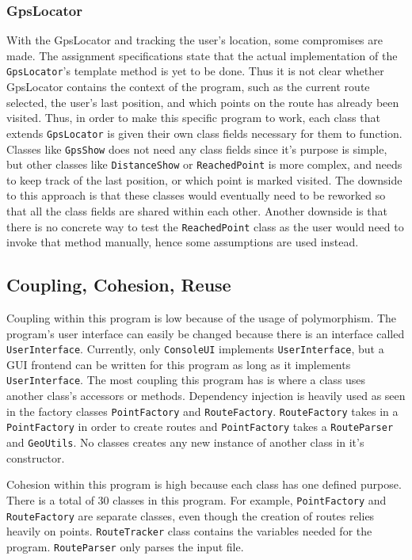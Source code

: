 \documentclass[a4paper, 12pt, titlepage]{article}
\newcommand{\code}[1]{\small\texttt{#1}\normalsize}
\begin{document}
\subsubsection{GpsLocator}

With the GpsLocator and tracking the user's location, some compromises are
made. The assignment specifications state that the actual implementation of the
\code{GpsLocator}'s template method is yet to be done. Thus it is not clear
whether GpsLocator contains the context of the program, such as the current
route selected, the user's last position, and which points on the route has
already been visited. Thus, in order to make this specific program to work,
each class that extends \code{GpsLocator} is given their own class fields
necessary for them to function. Classes like \code{GpsShow} does not need any
class fields since it's purpose is simple, but other classes like
\code{DistanceShow} or \code{ReachedPoint} is more complex, and needs to keep
track of the last position, or which point is marked visited. The downside to
this approach is that these classes would eventually need to be reworked so
that all the class fields are shared within each other. Another downside is
that there is no concrete way to test the \code{ReachedPoint} class as the user
would need to invoke that method manually, hence some assumptions are used
instead.


\subsection{Coupling, Cohesion, Reuse}

Coupling within this program is low because of the usage of polymorphism. The
program's user interface can easily be changed because there is an interface
called \code{UserInterface}. Currently, only \code{ConsoleUI} implements
\code{UserInterface}, but a GUI frontend can be written for this program as
long as it implements \code{UserInterface}. The most coupling this program has
is where a class uses another class's accessors or methods. Dependency
injection is heavily used as seen in the factory classes \code{PointFactory}
and \code{RouteFactory}. \code{RouteFactory} takes in a \code{PointFactory} in
order to create routes and \code{PointFactory} takes a \code{RouteParser} and
\code{GeoUtils}. No classes creates any new instance of another class in it's
constructor.

Cohesion within this program is high because each class has one defined
purpose. There is a total of 30 classes in this program. For example,
\code{PointFactory} and \code{RouteFactory} are separate classes, even though
the creation of routes relies heavily on points. \code{RouteTracker} class
contains the variables needed for the program. \code{RouteParser} only parses
the input file.
\end{document}
